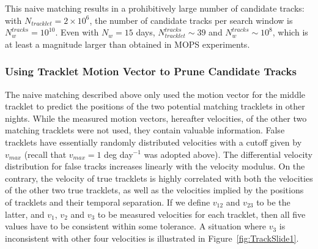 This naive matching results in a prohibitively large number of candidate tracks: with 
$N_{tracklet} = 2\times10^6$, the number of candidate tracks per search window is 
$N_{w}^{tracks} = 10^{10}$. Even with $N_w= 15$ days, $N_{tracklet}^{tracks} \sim 39$
and $N_{w}^{tracks} \sim 10^{8}$, which is at least a magnitude larger than obtained in 
MOPS experiments. 



\subsubsection{Using Tracklet Motion Vector to Prune Candidate Tracks} 

The naive matching described above only used the motion vector for the middle tracklet to 
predict the positions of the two potential matching tracklets in other nights. While the 
measured motion vectors, hereafter velocities, of the other two matching tracklets were not 
used, they contain valuable information. False tracklets have essentially randomly distributed 
velocities with a cutoff given by $v_{max}$ (recall that $v_{max} = 1$ deg day$^{-1}$ was adopted 
above). The differential velocity distribution for false tracks increases linearly with the
velocity modulus. On the contrary, the velocity of true tracklets is highly correlated with both 
the velocities of the other two true tracklets, as well as the velocities implied by the positions 
of tracklets and their temporal separation. If we define $v_{12}$ and $v_{23}$ to be the latter, and 
$v_1$, $v_2$ and $v_3$ to be measured velocities for each tracklet, then all five values
have to be consistent within some tolerance. A situation where $v_3$ is inconsistent with
other four velocities is illustrated in Figure~\ref{fig:TrackSlide1}.  



